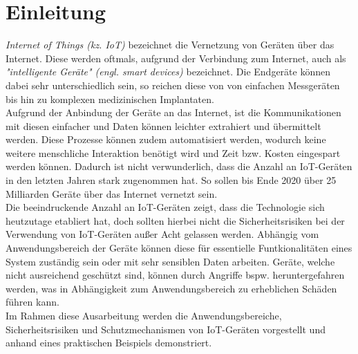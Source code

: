 \section{Einleitung}
\textit{Internet of Things (kz. IoT)} bezeichnet die Vernetzung von Geräten  über das Internet.
Diese werden oftmals, aufgrund der Verbindung zum Internet, auch als \textit{"intelligente Geräte" 
(engl. smart devices)} bezeichnet. Die Endgeräte können dabei sehr unterschiedlich sein, so reichen
diese von von einfachen Messgeräten bis hin zu komplexen medizinischen Implantaten. \cite{paper}\\

Aufgrund der Anbindung der Geräte an das Internet, ist die Kommunikationen mit diesen 
einfacher und Daten können leichter extrahiert und übermittelt werden. Diese Prozesse
können zudem automatisiert werden, wodurch keine weitere menschliche Interaktion
benötigt wird und Zeit bzw. Kosten eingespart werden können. Dadurch ist nicht verwunderlich,
dass die Anzahl an IoT-Geräten in den letzten Jahren stark zugenommen hat. So sollen bis Ende
2020 über 25 Milliarden Geräte über das Internet vernetzt sein. \cite{paper}\\

Die beeindruckende Anzahl an IoT-Geräten zeigt, dass die Technologie sich heutzutage etabliert hat,
doch sollten hierbei nicht die Sicherheitsrisiken bei der Verwendung von IoT-Geräten außer Acht
gelassen werden. Abhängig vom Anwendungsbereich der Geräte können diese für essentielle 
Funtkionalitäten eines System zuständig sein oder mit sehr sensiblen Daten arbeiten. 
Geräte, welche nicht ausreichend geschützt sind, können durch Angriffe bspw.  heruntergefahren
werden, was in Abhängigkeit zum Anwendungsbereich zu erheblichen Schäden führen kann. \cite{paper} \\

Im Rahmen diese Ausarbeitung werden die Anwendungsbereiche, Sicherheitsrisiken und Schutzmechanismen
von IoT-Geräten vorgestellt und anhand eines praktischen Beispiels  demonstriert.


  



